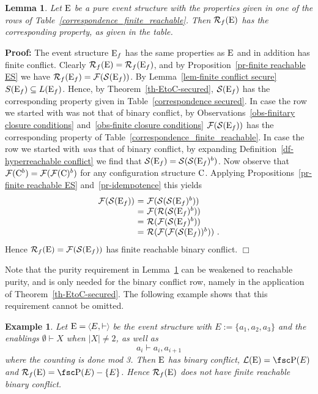 \documentclass[twocolumn]{article}
\newtheorem{lemm}{Lemma}
\newtheorem{exam}{Example}
\newenvironment{lemma}[1]{\begin{lemm} \rm \label{lem-#1} }{\end{lemm}}
\newenvironment{example}[1]{\begin{exam} \rm \label{ex-#1} }{\end{exam}}
\newenvironment{proof}{\begin{trivlist} \item[\hspace{\labelsep}\bf
Proof:]}{\hfill $\Box$\end{trivlist}}
\newcommand{\df}[1]{Definition~\ref{df-#1}}
\newcommand{\thm}[1]{Theorem~\ref{th-#1}}
\newcommand{\pr}[1]{Proposition~\ref{pr-#1}}
\newcommand{\lem}[1]{Lemma~\ref{lem-#1}}
\begin{document}
\begin{lemma}{G3r} Let ${\rm E}$ be a pure event structure
with the properties given in one of the rows of
Table~\ref{correspondence_finite_reachable}. Then ${\cal R}_f({\rm E})$ has the
corresponding property, as given in the table.
\end{lemma}
\begin{proof} The event structure ${\rm E}_f$ has the same properties as
${\rm E}$ and in addition has finite conflict. Clearly ${\cal R}_f({\rm E})={\cal R}_f({\rm E}_f)$,
and by \pr{finite reachable ES} we have ${\cal R}_f({\rm E}_f) = {\cal F}({\cal S}({\rm E}_f))$.
By \lem{finite conflict secure} $S({\rm E}_f)\subseteq L({\rm E}_f)$. Hence, by
\thm{EtoC-secured}, ${\cal S}({\rm E}_f)$ has the corresponding property given in
Table~\ref{correspondence secured}.  In case the row we started with
was not that of binary conflict, by Observations~\ref{obs-finitary
closure conditions} and~\ref{obs-finite closure conditions}
${\cal F}({\cal S}({\rm E}_f))$ has the corresponding property of
Table~\ref{correspondence_finite_reachable}.  In case the row we
started with \emph{was} that of binary conflict, by expanding
\df{hyperreachable conflict} we find that ${\cal S}({\rm E}_f) =
{\cal S}({\cal S}({\rm E}_f)^b)$. Now observe that ${\cal F}({\rm C}^b)={\cal F}({\cal F}({\rm C})^b)$
for any configuration structure ${\rm C}$.  Applying
Propositions~\ref{pr-finite reachable ES} and~\ref{pr-idempotence}
this yields $$\begin{array}{r@{~=~}l}
\fF(\fS(\eE_f)) & \fF(\fS(\fS(\eE_f)^b))\\
& \fF(\fR(\fS(\eE_f)^b))\\
& \fR(\fF(\fS(\eE_f)^b))\\
& \fR(\fF(\fF(\fS(\eE_f))^b))~.
\end{array}$$
Hence ${\cal R}_f({\rm E})={\cal F}({\cal S}({\rm E}_f))$ has finite reachable binary conflict.
\end{proof}
Note that the purity requirement in \lem{G3r} can be weakened to
reachable purity, and is only needed for the
binary conflict row, namely in the application of \thm{EtoC-secured}.
The following example shows that this requirement cannot be omitted.

\begin{example}{impure finite reachable binary conflict}
Let $\eE=\tuple{E,\vdash\;}$ be the event structure with
$E:=\{a_1,a_2,a_3\}$ and the enablings $\emptyset \vdash X$ when
$|X|\neq 2$, as well as $$a_i \vdash a_i,a_{i+1}$$ where the counting
is done mod 3. Then ${\rm E}$ has binary conflict, $\fL(\eE)=\pow(E)$ and
$\fR_f(\eE)=\pow(E)-\{E\}$. Hence ${\cal R}_f({\rm E})$ does not have finite
reachable binary conflict.
\end{example}
\end{document}
